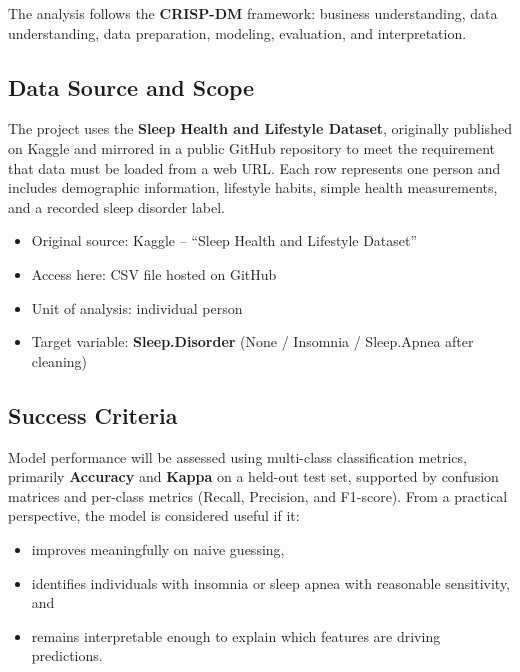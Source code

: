 \documentclass[
]{article}
\providecommand{\tightlist}{%
  \setlength{\itemsep}{0pt}\setlength{\parskip}{0pt}}
\begin{document}
The analysis follows the \textbf{CRISP-DM} framework: business
understanding, data understanding, data preparation, modeling,
evaluation, and interpretation.

\subsection{Data Source and Scope}\label{data-source-and-scope}

The project uses the \textbf{Sleep Health and Lifestyle Dataset},
originally published on Kaggle and mirrored in a public GitHub
repository to meet the requirement that data must be loaded from a web
URL. Each row represents one person and includes demographic
information, lifestyle habits, simple health measurements, and a
recorded sleep disorder label.

\begin{itemize}
\tightlist
\item
  Original source: Kaggle -- ``Sleep Health and Lifestyle Dataset''\\
\item
  Access here: CSV file hosted on GitHub\\
\item
  Unit of analysis: individual person\\
\item
  Target variable: \textbf{Sleep.Disorder} (None / Insomnia /
  Sleep.Apnea after cleaning)
\end{itemize}

\subsection{Success Criteria}\label{success-criteria}

Model performance will be assessed using multi-class classification
metrics, primarily \textbf{Accuracy} and \textbf{Kappa} on a held-out
test set, supported by confusion matrices and per-class metrics (Recall,
Precision, and F1-score). From a practical perspective, the model is
considered useful if it:

\begin{itemize}
\tightlist
\item
  improves meaningfully on naive guessing,\\
\item
  identifies individuals with insomnia or sleep apnea with reasonable
  sensitivity, and\\
\item
  remains interpretable enough to explain which features are driving
  predictions.
\end{itemize}
\end{document}
